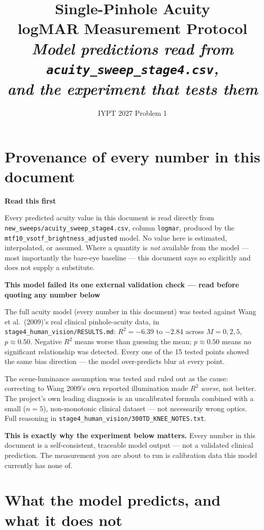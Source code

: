 \documentclass[11pt]{report}
\title{\textbf{\Huge Single-Pinhole Acuity}\\[0.3cm]
\textcolor{hbblue}{\huge logMAR Measurement Protocol}\\[0.5cm]
\large\itshape Model predictions read from \texttt{acuity\_sweep\_stage4.csv},\\
and the experiment that tests them}
\author{}
\date{IYPT 2027 Problem 1}
\newenvironment{warnbox}[1]%
{\par\vspace{8pt}\begin{lrbox}{\wbsave}\begin{minipage}{0.88\textwidth}%
{\bfseries\color{warnred}#1}\par\vspace{4pt}\ignorespaces}%
{\end{minipage}\end{lrbox}%
\begin{center}\setlength{\fboxrule}{1.2pt}\setlength{\fboxsep}{8pt}%
\fcolorbox{warnred}{white}{\usebox{\wbsave}}\end{center}\vspace{8pt}\par}
\begin{document}
\maketitle
\tableofcontents

\chapter*{Provenance of every number in this document}

\begin{warnbox}{Read this first}
Every predicted acuity value in this document is read directly from
\texttt{new\_sweeps/acuity\_sweep\_stage4.csv}, column \texttt{logmar}, produced by the
\texttt{mtf10\_vsotf\_brightness\_adjusted} model. No value here is estimated, interpolated, or
assumed. Where a quantity is \emph{not} available from the model --- most importantly the
bare-eye baseline --- this document says so explicitly and does not supply a substitute.
\end{warnbox}

\begin{warnbox}{This model failed its one external validation check --- read before quoting any number below}
The full acuity model (every number in this document) was tested against Wang et al.\ (2009)'s real
clinical pinhole-acuity data, in \texttt{stage4\_human\_vision/RESULTS.md}: $R^2 = -6.39$ to $-2.84$
across $M=0,2,5$, $p\approx0.50$. Negative $R^2$ means worse than guessing the mean; $p\approx0.50$
means no significant relationship was detected. Every one of the 15 tested points showed the same
bias direction --- the model over-predicts blur at every point.

The scene-luminance assumption was tested and ruled out as the cause: correcting to Wang 2009's own
reported illumination made $R^2$ \emph{worse}, not better. The project's own leading diagnosis is an
uncalibrated formula combined with a small ($n=5$), non-monotonic clinical dataset --- not
necessarily wrong optics. Full reasoning in \texttt{stage4\_human\_vision/300TD\_KNEE\_NOTES.txt}.

\textbf{This is exactly why the experiment below matters.} Every number in this document is a
self-consistent, traceable model output --- not a validated clinical prediction. The measurement you
are about to run is calibration data this model currently has none of.
\end{warnbox}

\chapter{What the model predicts, and what it does not}
\end{document}
